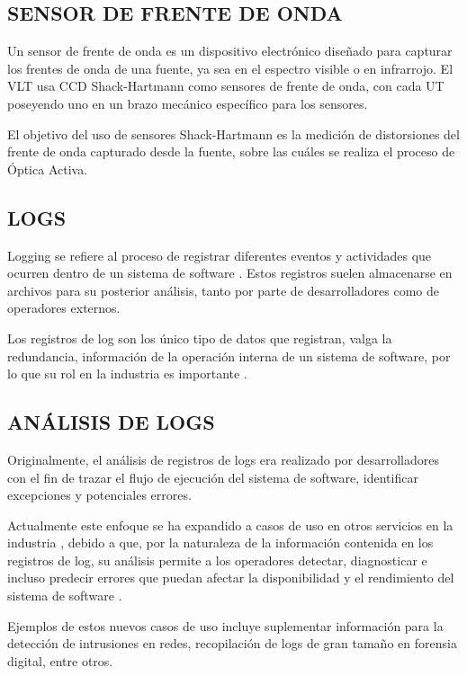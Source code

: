 \subsection{SENSOR DE FRENTE DE ONDA}
Un sensor de frente de onda es un dispositivo electrónico diseñado para capturar los frentes de onda de una fuente, ya sea en el espectro visible o en infrarrojo. El VLT usa CCD Shack-Hartmann como sensores de frente de onda, con cada UT poseyendo uno en un brazo mecánico específico para los sensores.\cite{eso1998vlt}

El objetivo del uso de sensores Shack-Hartmann es la medición de distorsiones del frente de onda capturado desde la fuente, sobre las cuáles se realiza el proceso de Óptica Activa.\cite{eso1998vlt}

\subsection{LOGS}
Logging se refiere al proceso de registrar diferentes eventos y actividades que ocurren dentro de un sistema de software \cite{jayathilake2011mind}. Estos registros suelen almacenarse en archivos para su posterior análisis, tanto por parte de desarrolladores como de operadores externos.

Los registros de log son los único tipo de datos que registran, valga la redundancia, información de la operación interna de un sistema de software, por lo que su rol en la industria es importante \cite{ma2023automatic}.

\subsection{ANÁLISIS DE LOGS}
Originalmente, el análisis de registros de logs era realizado por desarrolladores con el fin de trazar el flujo de ejecución del sistema de software, identificar excepciones y potenciales errores. \cite{jayathilake2011mind}

Actualmente este enfoque se ha expandido a casos de uso en otros servicios en la industria \cite{ma2023automatic}, debido a que, por la naturaleza de la información contenida en los registros de log, su análisis permite a los operadores detectar, diagnosticar e incluso predecir errores que puedan afectar la disponibilidad y el rendimiento del sistema de software \cite{jayathilake2011mind}.

Ejemplos de estos nuevos casos de uso incluye suplementar información para la detección de intrusiones en redes, recopilación de logs de gran tamaño en forensia digital, entre otros. \cite{ma2023automatic}

